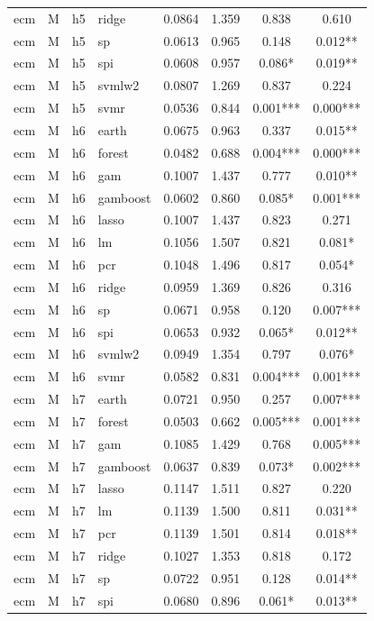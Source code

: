 \begin{ThreePartTable}
\begin{longtable}[t]{llclcccc}
ecm & M & h5 & ridge & 0.0864 & 1.359 & 0.838 & 0.610\\
ecm & M & h5 & sp & 0.0613 & 0.965 & 0.148 & 0.012**\\
ecm & M & h5 & spi & 0.0608 & 0.957 & 0.086* & 0.019**\\
ecm & M & h5 & svmlw2 & 0.0807 & 1.269 & 0.837 & 0.224\\
ecm & M & h5 & svmr & 0.0536 & 0.844 & 0.001*** & 0.000***\\
\addlinespace
ecm & M & h6 & earth & 0.0675 & 0.963 & 0.337 & 0.015**\\
ecm & M & h6 & forest & 0.0482 & 0.688 & 0.004*** & 0.000***\\
ecm & M & h6 & gam & 0.1007 & 1.437 & 0.777 & 0.010**\\
ecm & M & h6 & gamboost & 0.0602 & 0.860 & 0.085* & 0.001***\\
ecm & M & h6 & lasso & 0.1007 & 1.437 & 0.823 & 0.271\\
ecm & M & h6 & lm & 0.1056 & 1.507 & 0.821 & 0.081*\\
ecm & M & h6 & pcr & 0.1048 & 1.496 & 0.817 & 0.054*\\
ecm & M & h6 & ridge & 0.0959 & 1.369 & 0.826 & 0.316\\
ecm & M & h6 & sp & 0.0671 & 0.958 & 0.120 & 0.007***\\
ecm & M & h6 & spi & 0.0653 & 0.932 & 0.065* & 0.012**\\
ecm & M & h6 & svmlw2 & 0.0949 & 1.354 & 0.797 & 0.076*\\
ecm & M & h6 & svmr & 0.0582 & 0.831 & 0.004*** & 0.001***\\
\addlinespace
ecm & M & h7 & earth & 0.0721 & 0.950 & 0.257 & 0.007***\\
ecm & M & h7 & forest & 0.0503 & 0.662 & 0.005*** & 0.001***\\
ecm & M & h7 & gam & 0.1085 & 1.429 & 0.768 & 0.005***\\
ecm & M & h7 & gamboost & 0.0637 & 0.839 & 0.073* & 0.002***\\
ecm & M & h7 & lasso & 0.1147 & 1.511 & 0.827 & 0.220\\
ecm & M & h7 & lm & 0.1139 & 1.500 & 0.811 & 0.031**\\
ecm & M & h7 & pcr & 0.1139 & 1.501 & 0.814 & 0.018**\\
ecm & M & h7 & ridge & 0.1027 & 1.353 & 0.818 & 0.172\\
ecm & M & h7 & sp & 0.0722 & 0.951 & 0.128 & 0.014**\\
ecm & M & h7 & spi & 0.0680 & 0.896 & 0.061* & 0.013**\\

\end{longtable}
\end{ThreePartTable}
